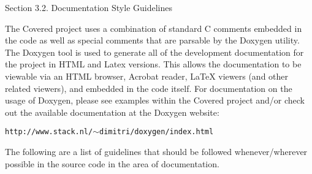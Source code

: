 \begin{Desc}
\item[Section 3.2.  Documentation Style Guidelines]\par
 The Covered project uses a combination of standard C comments embedded in the code as well as special comments that are parsable by the Doxygen utility. The Doxygen tool is used to generate all of the development documentation for the project in HTML and Latex versions. This allows the documentation to be viewable via an HTML browser, Acrobat reader, La\-Te\-X viewers (and other related viewers), and embedded in the code itself. For documentation on the usage of Doxygen, please see examples within the Covered project and/or check out the available documentation at the Doxygen website:

 {\tt http://www.stack.nl/$\sim$dimitri/doxygen/index.html}

 The following are a list of guidelines that should be followed whenever/wherever possible in the source code in the area of documentation.


\end{Desc}
